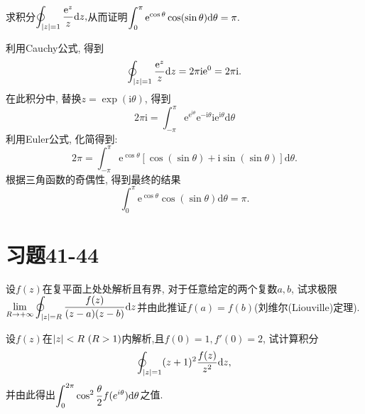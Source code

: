 \begin{yyEx}
	求积分$\begin{lgathered}
	\oint_{\abs{z} = 1}\frac{\mathrm{e}^z}{z}\mathrm{d}z,
	\end{lgathered}$从而证明$\begin{lgathered}
	\int_{0}^\pi  \mathrm{e}^{\cos\theta}\cos(\sin\theta)\mathrm{d}\theta = \pi.
	\end{lgathered}$
\end{yyEx}

\begin{yySolution}
	利用Cauchy公式, 得到
	\begin{equation*}
		\oint_{\lvert z\rvert = 1}\frac{\mathrm{e}^z}{z}\mathrm{d}z = 2\pi\mathrm{i}\mathrm{e}^0 = 2\pi\mathrm{i}.
	\end{equation*}
	在此积分中, 替换$z = \exp(\mathrm{i}\theta)$, 得到
	\begin{equation*}
		2\pi\mathrm{i} = \int_{-\pi}^{\pi}\mathrm{e}^{\mathrm{e}^{\mathrm{i}\theta}}\mathrm{e}^{-\mathrm{i}\theta} \mathrm{i}\mathrm{e}^{\mathrm{i}\theta}\mathrm{d}\theta
	\end{equation*}
	利用Euler公式, 化简得到:\begin{equation*}
		2\pi = \int_{-\pi}^{\pi} \mathrm{e}^{\cos\theta}\left[ \cos(\sin\theta) + \mathrm{i}\sin(\sin\theta) \right] \mathrm{d}\theta.
	\end{equation*}
	根据三角函数的奇偶性, 得到最终的结果\begin{equation*}
		\int_{0}^\pi  \mathrm{e}^{\cos\theta}\cos(\sin\theta)\mathrm{d}\theta = \pi.
	\end{equation*}
\end{yySolution}

\section{习题41-44}

\begin{yyEx}
	设$f(z)$在复平面上处处解析且有界, 对于任意给定的两个复数$a,b$, 试求极限\\ $\begin{lgathered}
	\lim\limits_{R\to +\infty}\oint_{\abs{z} = R}\frac{f(z)}{(z-a)(z-b)}\mathrm{d}z
	\end{lgathered}$并由此推证$f(a) = f(b)$(刘维尔(Liouville)定理).
\end{yyEx}



\begin{yyEx}
	设$f(z)$在$\lvert z\rvert<R~ (R>1)$内解析,且$f(0) = 1,f'(0) = 2$, 试计算积分\begin{equation*}
		\oint_{\lvert z\rvert = 1}(z+1)^2\frac{f(z)}{z^2}\mathrm{d}z,
	\end{equation*}
	并由此得出$\begin{lgathered}
	\int_{0}^{2\pi} \cos^2\frac{\theta}{2}f(e^{i\theta})  \mathrm{d}\theta
	\end{lgathered}$之值.
\end{yyEx}

